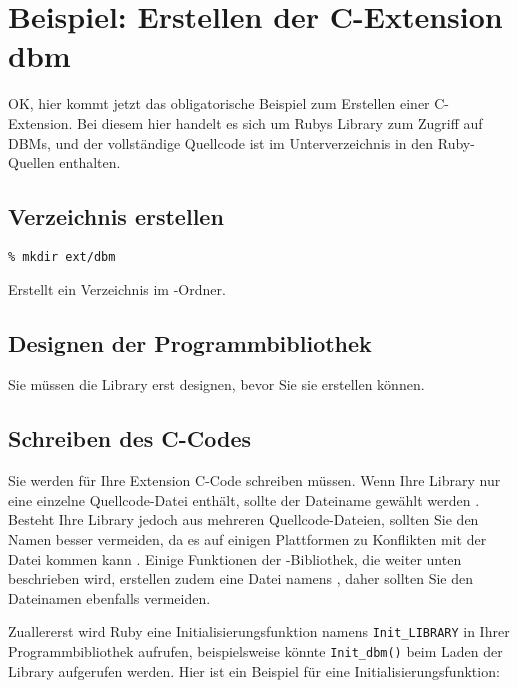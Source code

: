 \chapter{Beispiel: Erstellen der C-Extension dbm}
\label{cha:beispiel-dbm}


OK, hier kommt jetzt das obligatorische Beispiel zum Erstellen einer
C-Extension. Bei diesem hier handelt es sich um Rubys Library zum
Zugriff auf DBMs, und der vollständige Quellcode ist im
Unterverzeichnis  in den Ruby-Quellen enthalten.

\section{Verzeichnis erstellen}
\label{sec:verzeichnis}

\begin{verbatim}
% mkdir ext/dbm
\end{verbatim}
Erstellt ein Verzeichnis im -Ordner.

\section{Designen der Programmbibliothek}
\label{sec:design}

Sie müssen die Library erst designen, bevor Sie sie erstellen
können.

\section{Schreiben des C-Codes}
\label{sec:c-code}

Sie werden für Ihre Extension C-Code schreiben müssen. Wenn Ihre
Library nur eine einzelne Quellcode-Datei enthält, sollte der
Dateiname  gewählt werden . Besteht Ihre
Library jedoch aus mehreren Quellcode-Dateien, sollten Sie den Namen
 besser vermeiden, da es auf einigen Plattformen zu
Konflikten mit der Datei  kommen kann . Einige Funktionen der -Bibliothek, die weiter
unten beschrieben wird, erstellen zudem eine Datei namens
, daher sollten Sie den Dateinamen
 ebenfalls vermeiden.

Zuallererst wird Ruby eine Initialisierungsfunktion namens
\verb+Init_LIBRARY+ in Ihrer Programmbibliothek aufrufen,
beispielsweise könnte \verb+Init_dbm()+ beim Laden der Library
aufgerufen werden. Hier ist ein Beispiel für eine
Initialisierungsfunktion:

